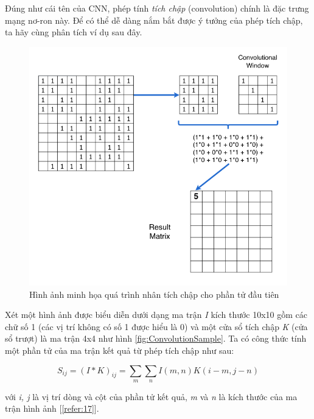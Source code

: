 \hspace{\parindent} Đúng như cái tên của CNN, phép tính \textit{tích chập} (convolution) chính là đặc trưng mạng nơ-ron này. Để có thể dễ dàng nắm bắt được ý tưởng của phép tích chập, ta hãy cùng phân tích ví dụ sau đây.

\begin{figure}[!h]
    	\centering
    		\includegraphics[width=0.9\columnwidth]{chapter05/figure/convolution_example.png}
    		\centering
    	\caption{Hình ảnh minh họa quá trình nhân tích chập cho phần tử đầu tiên}
    	\label{fig:ConvolutionExample}
    \end{figure}

Xét một hình ảnh được biểu diễn dưới dạng ma trận \textit{I }kích thước 10x10 gồm các chữ số 1 (các vị trí không có số 1 được hiểu là 0) và một cửa sổ tích chập \textit{K} (cửa sổ trượt) là ma trận 4x4 như hình \ref{fig:ConvolutionSample}. Ta có công thức tính một phần tử của ma trận kết quả từ phép tích chập như sau:

\begin{equation}
S_{ij} = (I * K)_{ij} =  \sum_{m} \sum_{n} I(m,n)K(i-m,j-n)
\end{equation}

với \textit{i, j} là vị trí dòng và cột của phần tử kết quả,\textit{ m} và \textit{n} là kích thước của ma trận hình ảnh [\ref{refer:17}].

